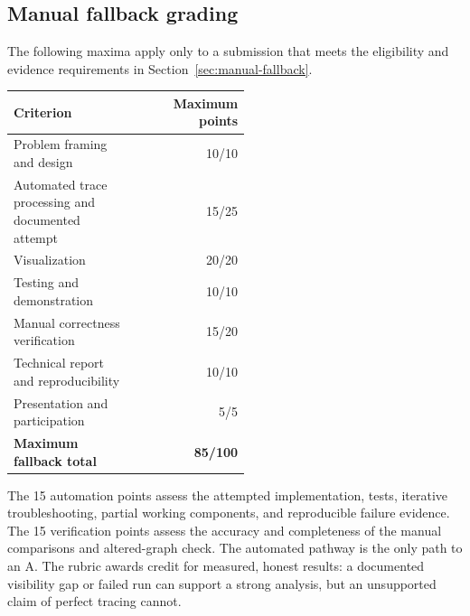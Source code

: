 \documentclass[11pt]{article}
\begin{document}
\begin{samepage}
\subsection*{Manual fallback grading}
The following maxima apply only to a submission that meets the eligibility and evidence requirements in Section~\ref{sec:manual-fallback}.
\begin{center}
\begin{tabular}{p{0.52\linewidth}r}
  \toprule
  Criterion                                             & Maximum points \\
  \midrule
  Problem framing and design                            & 10/10          \\
  Automated trace processing and documented attempt    & 15/25          \\
  Visualization                                         & 20/20          \\
  Testing and demonstration                             & 10/10          \\
  Manual correctness verification                      & 15/20          \\
  Technical report and reproducibility                  & 10/10          \\
  Presentation and participation                       & 5/5            \\
  \midrule
  \textbf{Maximum fallback total}                       & \textbf{85/100} \\
  \bottomrule
\end{tabular}
\end{center}
\end{samepage}

The 15 automation points assess the attempted implementation, tests, iterative troubleshooting, partial working components, and reproducible failure evidence. The 15 verification points assess the accuracy and completeness of the manual comparisons and altered-graph check. The automated pathway is the only path to an A. The rubric awards credit for measured, honest results: a documented visibility gap or failed run can support a strong analysis, but an unsupported claim of perfect tracing cannot.
\end{document}

